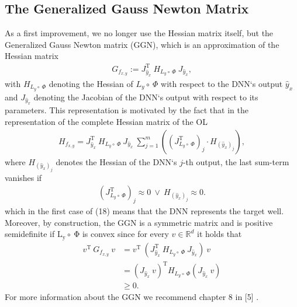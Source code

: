 \documentclass[conference]{IEEEtran}
\begin{document}
\subsection{The Generalized Gauss Newton Matrix}
As a first improvement, we no longer use the Hessian matrix itself, but the Generalized Gauss Newton matrix (GGN), which is an approximation of the Hessian matrix
\begin{align}
G_{f_{x, y}} := J_{\hat{y}_{x}}^{\mathrm{T}}\:H_{L_{y}\circ\:\Phi}\:J_{\hat{y}_{x}},
\end{align}
with $H_{L_{y}\circ\:\Phi}$ denoting the Hessian of $L_{y}\circ\:\Phi$ with respect to the DNN`s output $\hat{y}_{x}$ and $J_{\hat{y}_{x}}$ denoting the Jacobian of the DNN`s output with respect to its parameters.
This representation is motivated by the fact that in the representation of the complete Hessian matrix of the OL
\begin{align}
H_{f_{x, y}} = J_{\hat{y}_{x}}^{\mathrm{T}}\:H_{L_{y}\circ\:\Phi}\:J_{\hat{y}_{x}}\:\sum_{j = 1}^{m}\left(\left(J_{L_{y}\circ \:\Phi}^{\mathrm{T}}\right)_{j}\cdot H_{(\hat{y}_{x})_{j}}\right),
\end{align}
where $H_{(\hat{y}_{x})_{j}}$ denotes the Hessian of the DNN`s  $j$-th output, the last sum-term vanishes if 
\begin{align}
\left(J_{L_{y}\circ \:\Phi}^{\mathrm{T}}\right)_{j}\approx 0\:\lor\:H_{(\hat{y}_{x})_{j}} \approx 0.
\end{align}
which in the first case of (18) means that the DNN represents the target well.  Moreover, by construction, the GGN is a symmetric matrix and is positive semidefinite if $\mathrm{L_{y}\circ\:\Phi}$ is convex since for every $v\in\mathbb{R}^{d}$ it holds that
\begin{align}
v^{\mathrm{T}}\:G_{f_{x, y}}\:v &= v^{\mathrm{T}}\:\left( J_{\hat{y}_{x}}^{\mathrm{T}}\:H_{L_{y}\circ\:\Phi}\:J_{\hat{y}_{x}}\right)\:v\\
&= \left(J_{\hat{y}_{x}}\:v\right)^{\mathrm{T}}H_{L_{y}\circ\:\Phi}\left(J_{\hat{y}_{x}}\:v\right) \\
&\geq 0.
\end{align}
For more information about the GGN we recommend chapter 8 in [5] .
\end{document}
